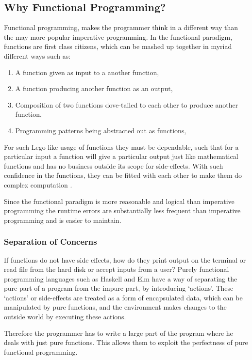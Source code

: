\subsection{Why Functional Programming?}
Functional programming, makes the programmer think in a different way than the
may more popular imperative programming. In the functional paradigm, functions are
first class citizens, which can be mashed up together in myriad different ways
such as:


\begin{enumerate}
\item A function given as input to a another function,
\item A function producing another function as an output,
\item Composition of two functions dove-tailed to each other to produce another function,
\item Programming patterns being abstracted out as functions,
\end{enumerate}

For such Lego like usage of functions they must be dependable, such that for a
particular input a function will give a particular output just like
mathematical functions and has no business outside its scope for side-effects.
With such confidence in the functions, they can be fitted with each other to
make them do complex computation \citep{Hughes89}.

Since the functional paradigm is more reasonable and logical than imperative
programming the runtime errors are substantially less frequent than imperative
programming and is easier to maintain.


\subsubsection{Separation of Concerns}
If functions do not have side effects, how do they print output on the terminal
or read file from the hard disk or accept inputs from a user? Purely functional
programming languages such as Haskell and Elm have a way of separating the pure %
part of a program from the impure part, by introducing `actions'. These
`actions' or side-effects are treated as a form of encapsulated data, which can
be manipulated by pure functions, and the environment makes changes to the
outside world by executing these actions.

Therefore the programmer has to write a large part of the program where he
deals with just pure functions. This allows them to exploit the perfectness of
pure functional programming.

